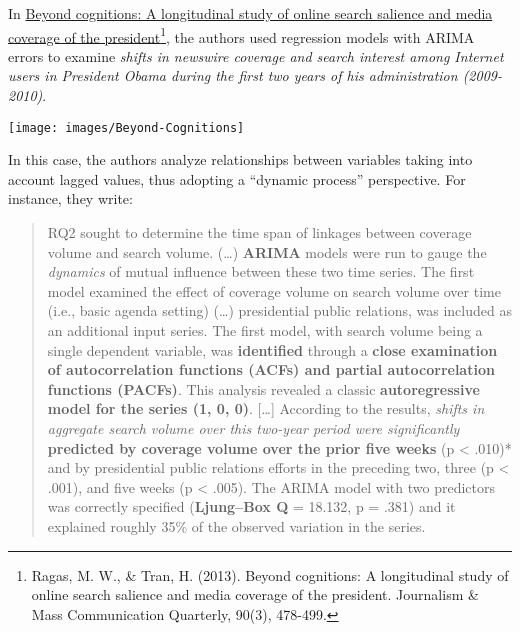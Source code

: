 \documentclass[
]{article}
\begin{document}
In \href{https://journals.sagepub.com/doi/abs/10.1177/1077699013493792}{Beyond cognitions: A longitudinal study of online search salience and media coverage of the president}\footnote{Ragas, M. W., \& Tran, H. (2013). Beyond cognitions: A longitudinal study of online search salience and media coverage of the president. Journalism \& Mass Communication Quarterly, 90(3), 478-499.}, the authors used regression models with ARIMA errors to examine \emph{shifts in newswire coverage and search interest among Internet users in President Obama during the first two years of his administration (2009-2010)}.

\texttt{[image: images/Beyond-Cognitions]}

In this case, the authors analyze relationships between variables taking into account lagged values, thus adopting a ``dynamic process'' perspective. For instance, they write:

\begin{quote}
RQ2 sought to determine the time span of linkages between coverage volume and search volume. (\ldots) \textbf{ARIMA} models were run to gauge the \emph{dynamics} of mutual influence between these two time series. The first model examined the effect of coverage volume on search volume over time (i.e., basic agenda setting) (\ldots) presidential public relations, was included as an additional input series. The first model, with search volume being a single dependent variable, was \textbf{identified} through a \textbf{close examination of autocorrelation functions (ACFs) and partial autocorrelation functions (PACFs)}. This analysis revealed a classic \textbf{autoregressive model for the series (1, 0, 0)}. {[}\ldots{]} According to the results, \emph{shifts in aggregate search volume over this two-year period were significantly} \textbf{predicted by coverage volume over the prior five weeks} (p \textless{} .010)* and by presidential public relations efforts in the preceding two, three (p \textless{} .001), and five weeks (p \textless{} .005). The ARIMA model with two predictors was correctly specified (\textbf{Ljung--Box Q} = 18.132, p = .381) and it explained roughly 35\% of the observed variation in the series.
\end{quote}
\end{document}
